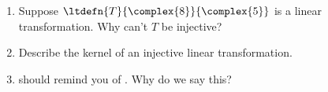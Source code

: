 \begin{enumerate}
%
\item Suppose $\ltdefn{T}{\complex{8}}{\complex{5}}$ is a linear transformation.  Why can't $T$ be injective?
%
\item Describe the kernel of an injective linear transformation.
%
\item {} should remind you of .  Why do we say this?
%
\end{enumerate}